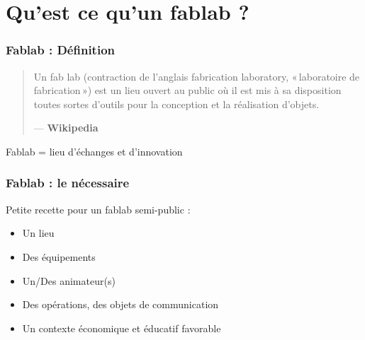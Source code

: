 \documentclass[10pt, compress]{beamer}
\begin{document}
	\section{Qu'est ce qu'un fablab ?}
	\begin{frame}
		\frametitle{Fablab : Définition}
		\begin{quote}
			Un fab lab (contraction de l'anglais fabrication laboratory, «\,laboratoire de fabrication\,») est un lieu ouvert au
			public où il est mis à sa disposition toutes sortes d'outils pour la conception et la réalisation d'objets.\\
			\begin{flushright}
			--- \textbf{Wikipedia}
			\end{flushright}
		\end{quote}
		\pause

		\begin{center}
			\large Fablab = \alert{lieu d'échanges et d'innovation}
		\end{center}
	\end{frame}

	\begin{frame}
		\frametitle{Fablab : le nécessaire}

		Petite recette pour un fablab semi-public :

		\pause

		\begin{itemize}[<+->]
			\item Un \alert{lieu}
			\item Des \alert{équipements}
			\item Un/Des animateur(s)
			\item Des opérations, des objets de \alert{communication}
			\item Un \alert{contexte} économique et éducatif \alert{favorable}
		\end{itemize}
	\end{frame}
\end{document}
